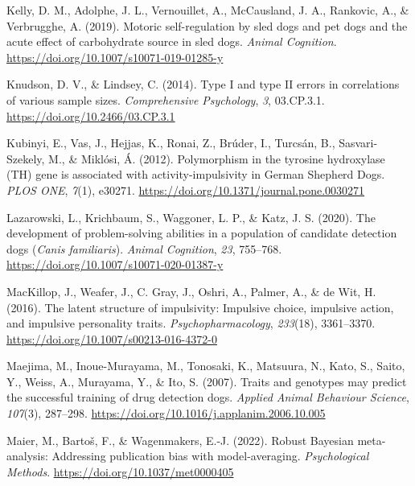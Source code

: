 \documentclass[
  ,pub,floatsintext]{apa6}
\newlength{\cslhangindent}
\newlength{\cslentryspacingunit} %
\newenvironment{CSLReferences}[2] %
 {%
  \setlength{\parindent}{0pt}
  \ifodd #1
  \let\oldpar\par
  \def\par{\hangindent=\cslhangindent\oldpar}
  \fi
  \setlength{\parskip}{#2\cslentryspacingunit}
 }%
 {}
\begin{document}
\begin{CSLReferences}{1}{0}
\leavevmode{}%
Kelly, D. M., Adolphe, J. L., Vernouillet, A., McCausland, J. A., Rankovic, A., \& Verbrugghe, A. (2019). Motoric self-regulation by sled dogs and pet dogs and the acute effect of carbohydrate source in sled dogs. \emph{Animal Cognition}. \url{https://doi.org/10.1007/s10071-019-01285-y}

\leavevmode{}%
Knudson, D. V., \& Lindsey, C. (2014). Type {I} and type {II} errors in correlations of various sample sizes. \emph{Comprehensive Psychology}, \emph{3}, 03.CP.3.1. \url{https://doi.org/10.2466/03.CP.3.1}

\leavevmode{}%
Kubinyi, E., Vas, J., Hejjas, K., Ronai, Z., Brúder, I., Turcsán, B., Sasvari-Szekely, M., \& Miklósi, Á. (2012). Polymorphism in the tyrosine hydroxylase ({TH}) gene is associated with activity-impulsivity in {German Shepherd Dogs}. \emph{PLOS ONE}, \emph{7}(1), e30271. \url{https://doi.org/10.1371/journal.pone.0030271}

\leavevmode{}%
Lazarowski, L., Krichbaum, S., Waggoner, L. P., \& Katz, J. S. (2020). The development of problem-solving abilities in a population of candidate detection dogs (\emph{{Canis} familiaris}). \emph{Animal Cognition}, \emph{23}, 755--768. \url{https://doi.org/10.1007/s10071-020-01387-y}

\leavevmode{}%
MacKillop, J., Weafer, J., C. Gray, J., Oshri, A., Palmer, A., \& de Wit, H. (2016). The latent structure of impulsivity: Impulsive choice, impulsive action, and impulsive personality traits. \emph{Psychopharmacology}, \emph{233}(18), 3361--3370. \url{https://doi.org/10.1007/s00213-016-4372-0}

\leavevmode{}%
Maejima, M., Inoue-Murayama, M., Tonosaki, K., Matsuura, N., Kato, S., Saito, Y., Weiss, A., Murayama, Y., \& Ito, S. (2007). Traits and genotypes may predict the successful training of drug detection dogs. \emph{Applied Animal Behaviour Science}, \emph{107}(3), 287--298. \url{https://doi.org/10.1016/j.applanim.2006.10.005}

\leavevmode{}%
Maier, M., Bartoš, F., \& Wagenmakers, E.-J. (2022). Robust {Bayesian} meta-analysis: {Addressing} publication bias with model-averaging. \emph{Psychological Methods}. \url{https://doi.org/10.1037/met0000405}


\end{CSLReferences}
\end{document}
